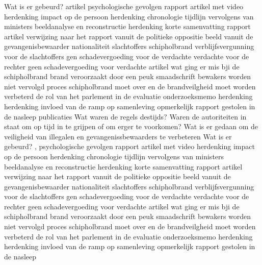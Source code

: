 Wat is er gebeurd?
\cite{schipholbrand27102005video}
artikel
\cite{schipholbrand27102005video}
psychologische gevolgen
rapport
\cite{onderzoeksraad2610schipholoost}
artikel met video
herdenking
impact op de persoon
herdenking
\cite{schipholbrandvideoargos}
chronologie
\cite{nunl30052023feitenoverzicht}
tijdlijn
vervolgens van ministers
beeldanalyse en reconstructie
\cite{}
herdenking
korte samenvatting
rapport
artikel
verwijzing naar het rapport vanuit de politieke oppositie
beeld vanuit de gevangenisbewaarder
nationaliteit slachtoffers schipholbrand
verblijfsvergunning voor de slachtoffers
gen schadevergoeding voor de verdachte
verdachte voor de rechter
geen schadevergoeding voor verdachte
artikel wat ging er mis bji de schipholbrand
brand veroorzaakt door een peuk
smaadschrift
bewakers worden niet vervolgd
proces schipholbrand moet over en de brandveilgheid moet worden verbeterd
de rol van het parlement in de evaluatie
\cite{parlementairemonitorschipholbrand}
onderzoeksmemo
herdenking
herdenking
invloed van de ramp op samenleving
\cite{videonpoNOVA13112008}
opmerkelijk rapport gestolen in de nasleep
\cite{rizoomes01052014schipholbrand}
publicaties
\cite{heuvelkroesschipholbrandcamerabeelden}
Wat waren de regels destijds?
Waren de autoriteiten in staat om op tijd in te grijpen of om erger te voorkomen?
Wat is er gedaan om de veiligheid van illegalen en gevangenissbewaarders te verbeteren
Wat is er gebeurd?
\cite{wikiSchipholbrand},\cite{schipholbrand27102005video}
psychologische gevolgen
rapport
\cite{onderzoeksraad2610schipholoost}
artikel met video
herdenking
impact op de persoon
herdenking
\cite{schipholbrandvideoargos}
chronologie
\cite{nunl30052023feitenoverzicht}
tijdlijn
\cite{singeluitgeverijenSchipholbrand}
vervolgens van ministers
beeldanalyse en reconstructie
\cite{eenvandaagschipholbrand}
herdenking
korte samenvatting
rapport
artikel
verwijzing naar het rapport vanuit de politieke oppositie
beeld vanuit de gevangenisbewaarder
nationaliteit slachtoffers schipholbrand
verblijfsvergunning voor de slachtoffers
gen schadevergoeding voor de verdachte
verdachte voor de rechter
geen schadevergoeding voor verdachte
artikel wat ging er mis bji de schipholbrand
brand veroorzaakt door een peuk
smaadschrift
bewakers worden niet vervolgd
proces schipholbrand moet over en de brandveilgheid moet worden verbeterd
de rol van het parlement in de evaluatie
\cite{parlementairemonitorschipholbrand}
onderzoeksmemo
herdenking
herdenking
invloed van de ramp op samenleving
\cite{videonpoNOVA13112008}
opmerkelijk rapport gestolen in de nasleep
\cite{rizoomes01052014schipholbrand}
